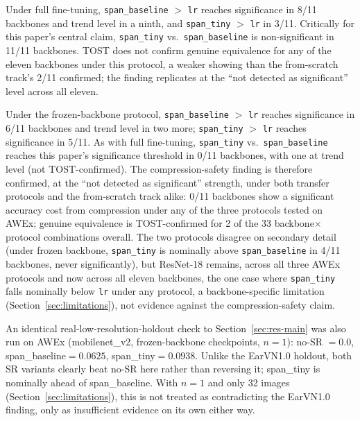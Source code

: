 \documentclass[pdflatex,sn-vancouver-num]{sn-jnl}
\begin{document}
Under full fine-tuning, \texttt{span\_baseline} $>$ \texttt{lr} reaches significance in 8/11 backbones and trend level in a ninth, and \texttt{span\_tiny} $>$ \texttt{lr} in 3/11. Critically for this paper's central claim, \texttt{span\_tiny} vs.\ \texttt{span\_baseline} is non-significant in 11/11 backbones. TOST does not confirm genuine equivalence for any of the eleven backbones under this protocol, a weaker showing than the from-scratch track's 2/11 confirmed; the finding replicates at the ``not detected as significant'' level across all eleven.

Under the frozen-backbone protocol, \texttt{span\_baseline} $>$ \texttt{lr} reaches significance in 6/11 backbones and trend level in two more; \texttt{span\_tiny} $>$ \texttt{lr} reaches significance in 5/11. As with full fine-tuning, \texttt{span\_tiny} vs.\ \texttt{span\_baseline} reaches this paper's significance threshold in 0/11 backbones, with one at trend level (not TOST-confirmed). The compression-safety finding is therefore confirmed, at the ``not detected as significant'' strength, under both transfer protocols and the from-scratch track alike: 0/11 backbones show a significant accuracy cost from compression under any of the three protocols tested on AWEx; genuine equivalence is TOST-confirmed for 2 of the 33 backbone$\times$protocol combinations overall. The two protocols disagree on secondary detail (under frozen backbone, \texttt{span\_tiny} is nominally above \texttt{span\_baseline} in 4/11 backbones, never significantly), but ResNet-18 remains, across all three AWEx protocols and now across all eleven backbones, the one case where \texttt{span\_tiny} falls nominally below \texttt{lr} under any protocol, a backbone-specific limitation (Section~\ref{sec:limitations}), not evidence against the compression-safety claim.

An identical real-low-resolution-holdout check to Section~\ref{sec:res-main} was also run on AWEx (mobilenet\_v2, frozen-backbone checkpoints, $n=1$): no-SR $=0.0$, span\_baseline$=0.0625$, span\_tiny$=0.0938$. Unlike the EarVN1.0 holdout, both SR variants clearly beat no-SR here rather than reversing it; span\_tiny is nominally ahead of span\_baseline. With $n=1$ and only 32 images (Section~\ref{sec:limitations}), this is not treated as contradicting the EarVN1.0 finding, only as insufficient evidence on its own either way.
\end{document}
